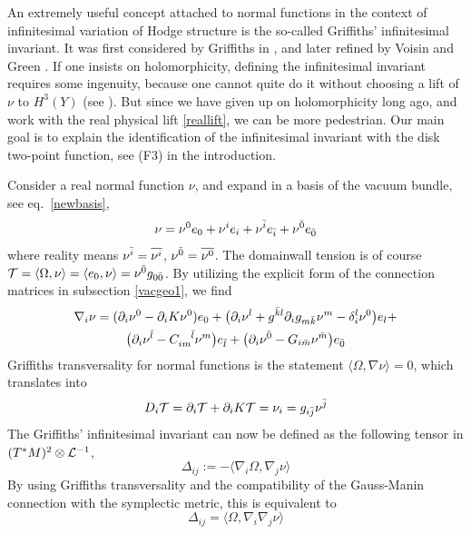 An extremely useful concept attached to normal functions in the
context of infinitesimal variation of Hodge structure is the 
so-called Griffiths' infinitesimal invariant. It was first
considered by Griffiths in \cite{griffiths2}, and later refined
by Voisin \cite{voisin} and Green \cite{green}. If one insists on
holomorphicity, defining the infinitesimal invariant requires some 
ingenuity, because one cannot quite do it without choosing a lift 
of $\nu$ to $H^3(Y)$ (see \cite{cime}). But since we have given 
up on holomorphicity long ago, and work with the real physical 
lift \eqref{reallift}, we can be more pedestrian. Our main goal
is to explain the identification of the infinitesimal invariant
with the disk two-point function, see (F3) in the introduction.

Consider a real normal function $\nu$, and expand in a basis of
the vacuum bundle, see eq.\ \eqref{newbasis},
\begin{equation}
\nu = \nu^0 e_0+\nu^i e_i + \nu^\ib e_\ib + \nu^\0b e_\0b
\end{equation}
where reality means $\nu^{\bar i}=\overline{\nu^i}$, $\nu^\0b=
\overline{\nu^0}$. The domainwall tension is of course 
$\calt=\langle\Omega,\nu\rangle=\langle e_0,\nu\rangle=\nu^\0b 
g_{0\0b}$. By utilizing the explicit form of the connection matrices 
in subsection \ref{vacgeo1}, we find
\begin{multline}
\eqlabel{explderiv}
\nabla_i\nu=(\del_i\nu^0-\del_i K\nu^0)e_0 +
\bigl(\del_i\nu^l + g^{\kb l}\del_i g_{m\kb} \nu^m -\delta_i^l\nu^0\bigr)
e_l + \\ \bigl(\del_i\nu^\lb - C_{im}^{\;\;\;\;\lb} \nu^m\bigr) e_\lb
+\bigl(\del_i\nu^\0b - G_{i\mb}\nu^\mb\bigr) e_\0b
\end{multline}
Griffiths transversality for normal functions is the
statement $\langle\Omega,\nabla\nu \rangle=0$, which translates into
\begin{equation}
D_i{\cal T} =\partial_i{\cal T}+\partial_i K {\cal T} =  \nu_i = g_{i{\bar j}} \nu^{\bar j}
\end{equation}
The Griffiths' infinitesimal invariant can now be defined as
the following tensor in $(T^*M)^2 \otimes {\cal L}^{-1}$,
\begin{equation}
\Delta_{ij} := -\langle\nabla_i \Omega , \nabla_j \nu\rangle
\end{equation}
By using Griffiths transversality and the compatibility of the
Gauss-Manin connection with the symplectic metric, this
is equivalent to 
\begin{equation}
\Delta_{ij} = \langle \Omega , \nabla_i\nabla_j\nu\rangle
\end{equation}
